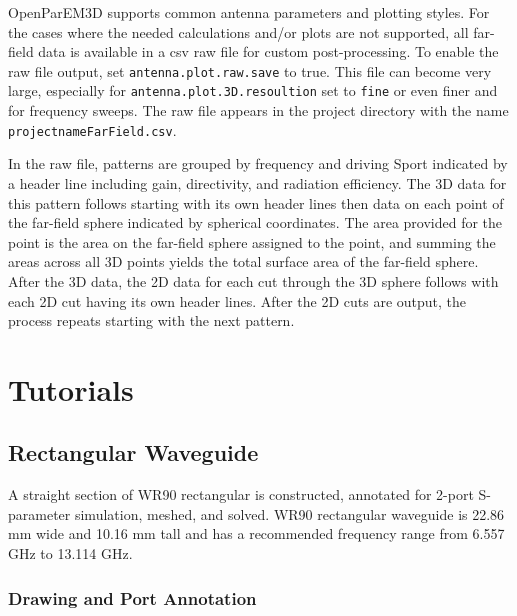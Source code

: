 \documentclass[titlepage]{article}
\renewcommand\_{\textunderscore\linebreak[1]}
\begin{document}
OpenParEM3D supports common antenna parameters and plotting styles.  For the cases where the needed calculations and/or plots are not supported, all far-field data is available in a csv raw file for custom post-processing.  To enable the raw file output, set \texttt{antenna.plot.raw.save} to true.  This file can become very large, especially for \texttt{antenna.plot.3D.resoultion} set to \texttt{fine} or even finer and for frequency sweeps.  The raw file appears in the project directory with the name \texttt{projectname\_FarField.csv}.

In the raw file, patterns are grouped by frequency and driving Sport indicated by a header line including gain, directivity, and radiation efficiency.  The 3D data for this pattern follows starting with its own header lines then data on each point of the far-field sphere indicated by spherical coordinates.  The area provided for the point is the area on the far-field sphere assigned to the point, and summing the areas across all 3D points yields the total surface area of the far-field sphere.  After the 3D data, the 2D data for each cut through the 3D sphere follows with each 2D cut having its own header lines.  After the 2D cuts are output, the process repeats starting with the next pattern.

\section{Tutorials}
\label{sec:tutorials}

\subsection{Rectangular Waveguide}
A straight section of WR90 rectangular is constructed, annotated for 2-port S-parameter simulation, meshed, and solved.  WR90 rectangular waveguide is 22.86 mm wide and 10.16 mm tall and has a recommended frequency range from 6.557 GHz to 13.114 GHz.

\subsubsection{Drawing and Port Annotation}
\end{document}
